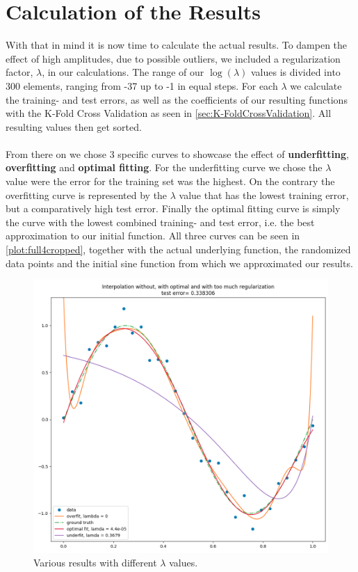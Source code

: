 \documentclass{article}
\begin{document}
\section{Calculation of the Results}
\label{sec:CalculateTheResults}
With that in mind it is now time to calculate the actual results. To dampen the effect of high amplitudes, due to possible outliers, we included a regularization factor, $\lambda$, in our calculations. The range of our $\log(\lambda)$ values is divided into 300 elements, ranging from -37 up to -1 in equal steps. For each $\lambda$ we calculate the training- and test errors, as well as the coefficients of our resulting functions with the K-Fold Cross Validation as seen in \autoref{sec:K-FoldCrossValidation}. All resulting values then get sorted. \\
\\
From there on we chose 3 specific curves to showcase the effect of \textbf{underfitting}, \textbf{overfitting} and \textbf{optimal fitting}. For the underfitting curve we chose the $\lambda$ value were the error for the training set was the highest. On the contrary the overfitting curve is represented by the $\lambda$ value that has the lowest training error, but a comparatively high test error. Finally the optimal fitting curve is simply the curve with the lowest combined training- and test error, i.e. the best approximation to our initial function. All three curves can be seen in \autoref{plot:full4cropped}, together with the actual underlying function, the randomized data points and the initial sine function from which we approximated our results.  

\begin{figure}[h]
	\centering
	\includegraphics[width=0.9\linewidth]{plots/full4cropped.png}
	\caption{Various results with different $\lambda$ values. }
	\label{plot:full4cropped}
\end{figure}
\end{document}
